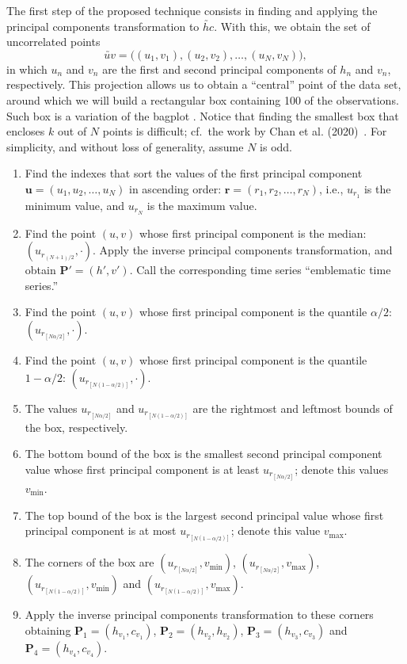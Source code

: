\documentclass[a4,11pt]{pssbmac}
\begin{document}
The first step of the proposed technique consists in finding and applying the principal components transformation to $\utilde{hc}$.
With this, we obtain the set of uncorrelated points 
$$\utilde{uv}=\big((u_1,v_1), (u_2,v_2),\dots,(u_N,v_N)\big),$$ 
in which $u_n$ and $v_n$ are the first and second principal components of $h_n$ and $v_n$, respectively.
This projection allows us to obtain a ``central'' point of the data set, around which we will build a rectangular box containing \SI{100}{\minusalphapercent} of the observations.
Such box is a variation of the bagplot \cite{TheBagplotaBivariateBoxplot}.
Notice that finding the smallest box that encloses $k$ out of $N$ points is difficult; cf.\ the work by Chan et al. (2020)~\cite{SmallestKEnclosingRectangleRevisited}.
For simplicity, and without loss of generality, assume $N$ is odd.
\begin{enumerate}
	\item Find the indexes that sort the values of the first principal component $\bm u=(u_1,u_2,\dots,u_N)$ in ascending order: $\bm r=(r_1,r_2,\dots,r_N)$, i.e., $u_{r_1}$ is the minimum value, and $u_{r_N}$ is the maximum value.
	\item\label{item:Median} Find the point $(u,v)$ whose first principal component is the median: $(u_{r_{(N+1)/2}}, \cdot)$. Apply the inverse principal components transformation, and obtain $\bm P'=(h',v')$. Call the corresponding time series ``emblematic time series.''
	\item\label{item:Point1} Find the point $(u,v)$ whose first principal component is the quantile $\alpha/2$: $(u_{r_{[N\alpha/2]}}, \cdot)$.
	\item\label{item:Point2} Find the point $(u,v)$ whose first principal component is the quantile $1-\alpha/2$: $(u_{r_{[N(1-\alpha/2)]}}, \cdot)$.
	\item\label{item:Point3} The values $u_{r_{[N\alpha/2]}}$ and $u_{r_{[N(1-\alpha/2)]}}$ are the rightmost and leftmost bounds of the box, respectively.
	\item\label{item:Point4} The bottom bound of the box is the smallest second principal component value whose first principal component is at least $u_{r_{[N\alpha/2]}}$; denote this values $v_{\min}$.
	\item\label{item:Point5} The top bound of the box is the largest second principal value whose first principal component is at most $u_{r_{[N(1-\alpha/2)]}}$; denote this value $v_{\max}$.
	\item The corners of the box are 
	$(u_{r_{[N\alpha/2]}}, v_{\min})$, 
	$(u_{r_{[N\alpha/2]}}, v_{\max})$, 
	$(u_{r_{[N(1-\alpha/2)]}}, v_{\min})$ and 
	$(u_{r_{[N(1-\alpha/2)]}},v_{\max})$.
	\item\label{item:BoxHxC} Apply the inverse principal components transformation to these corners obtaining $\bm P_1=(h_{v_1}, c_{v_1})$, $\bm P_2=(h_{v_2},h_{v_2})$, $\bm P_3=(h_{v_3}, c_{v_3})$ and $\bm P_4=(h_{v_4},c_{v_4})$.
\end{enumerate}
\end{document}
